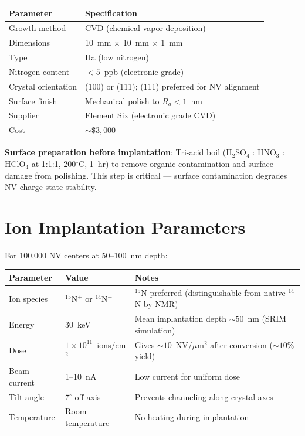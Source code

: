 \documentclass[11pt,a4paper,openany]{book}
\begin{document}
\begin{center}
\begin{tabular}{ll}
\toprule
\textbf{Parameter} & \textbf{Specification} \\
\midrule
Growth method & CVD (chemical vapor deposition) \\
Dimensions & 10~mm $\times$ 10~mm $\times$ 1~mm \\
Type & IIa (low nitrogen) \\
Nitrogen content & $< 5$~ppb (electronic grade) \\
Crystal orientation & (100) or (111); (111) preferred for NV alignment \\
Surface finish & Mechanical polish to $R_a < 1$~nm \\
Supplier & Element Six (electronic grade CVD) \\
Cost & ${\sim}\$3{,}000$ \\
\bottomrule
\end{tabular}
\end{center}

\noindent
\textbf{Surface preparation before implantation}: Tri-acid boil (H$_2$SO$_4$ : HNO$_3$ : HClO$_4$ at 1:1:1, 200$^\circ$C, 1~hr) to remove organic contamination and surface damage from polishing. This step is critical --- surface contamination degrades NV charge-state stability.

\section{Ion Implantation Parameters}

For 100,000 NV centers at 50--100~nm depth:

\begin{center}
\begin{tabular}{lll}
\toprule
\textbf{Parameter} & \textbf{Value} & \textbf{Notes} \\
\midrule
Ion species & $^{15}$N$^+$ or $^{14}$N$^+$ & $^{15}$N preferred (distinguishable from native $^{14}$N by NMR) \\
Energy & 30~keV & Mean implantation depth ${\sim}50$~nm (SRIM simulation) \\
Dose & $1 \times 10^{11}$~ions/cm$^2$ & Gives ${\sim}10$~NV/$\mu$m$^2$ after conversion (${\sim}10\%$ yield) \\
Beam current & 1--10~nA & Low current for uniform dose \\
Tilt angle & 7$^\circ$ off-axis & Prevents channeling along crystal axes \\
Temperature & Room temperature & No heating during implantation \\
\bottomrule
\end{tabular}
\end{center}
\end{document}
